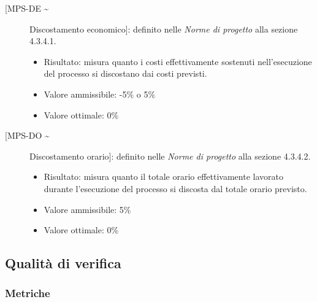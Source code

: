 \documentclass[../piano-di-qualifica.tex]{subfiles}
\begin{document}
\begin{description}
  \item [[MPS-DE \textasciitilde] Discostamento economico]: definito nelle \textit{Norme di progetto} alla sezione 4.3.4.1.
        \begin{itemize} \item Risultato: misura quanto i costi effettivamente sostenuti nell'esecuzione del
                processo si discostano dai costi previsti. \item Valore ammissibile: -5\% o 5\% \item Valore ottimale: 0\% \end{itemize}

  \item [[MPS-DO \textasciitilde] Discostamento orario]: definito nelle \textit{Norme di progetto} alla sezione 4.3.4.2.
        \begin{itemize} \item Risultato: misura quanto il totale orario effettivamente lavorato durante l'esecuzione
                del processo si discosta dal totale orario previsto. \item Valore ammissibile: 5\% \item Valore ottimale: 0\% \end{itemize}
\end{description}


\subsection{Qualità di verifica}%
\label{subsec:qualita_verifica}

\subsubsection{Metriche}%
\label{subsec:metriche_ver}
\end{document}
